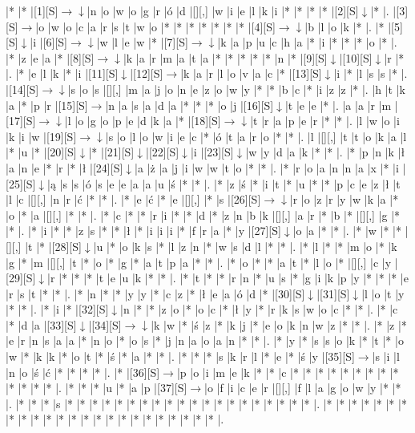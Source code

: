 \documentclass[11pt]{article}
\newcommand\drarr{$\rightarrow \!\!\!\!\! \downarrow$}
\newcommand\rarr{$\rightarrow$}
\newcommand\darr{$\downarrow$}
\begin{document}
\noindent\begin{Puzzle}{23}{29}|*	|*	|[1][S]\drarr	|n	|o	|w	|o	|g	|r	|ó	|d	|[][,]{ }	|w	|i	|e	|l	|k	|i	|*	|*	|*	|*	|[2][S]\darr	|*	|.
|[3][S]\rarr	|o	|w	|o	|c	|a	|r	|s	|t	|w	|o	|*	|*	|*	|*	|*	|*	|*	|[4][S]\drarr	|b	|l	|o	|k	|*	|.
|*	|[5][S]\darr	|i	|[6][S]\drarr	|w	|l	|e	|w	|*	|[7][S]\drarr	|k	|a	|p	|u	|c	|h	|a	|*	|i	|*	|*	|*	|o	|*	|.
|*	|z	|e	|a	|*	|[8][S]\drarr	|k	|a	|r	|m	|a	|t	|a	|*	|*	|*	|*	|*	|n	|*	|[9][S]\darr	|[10][S]\darr	|r	|*	|.
|*	|e	|l	|k	|*	|i	|[11][S]\darr	|[12][S]\rarr	|k	|a	|r	|l	|o	|v	|a	|c	|*	|[13][S]\darr	|i	|*	|l	|s	|s	|*	|.
|[14][S]\drarr	|s	|o	|s	|[][,]{ }	|m	|a	|j	|o	|n	|e	|z	|o	|w	|y	|*	|*	|b	|c	|*	|i	|z	|z	|*	|.
|h	|t	|k	|a	|*	|p	|r	|[15][S]\rarr	|n	|a	|s	|a	|d	|a	|*	|*	|*	|o	|j	|[16][S]\darr	|t	|e	|e	|*	|.
|a	|a	|r	|m	|[17][S]\drarr	|l	|o	|g	|o	|p	|e	|d	|k	|a	|*	|[18][S]\drarr	|t	|r	|a	|p	|e	|r	|*	|*	|.
|l	|w	|o	|i	|k	|i	|w	|[19][S]\drarr	|s	|o	|l	|o	|w	|i	|e	|c	|*	|ó	|t	|a	|r	|o	|*	|*	|.
|l	|[][,]{ }	|t	|t	|o	|k	|a	|l	|*	|u	|*	|[20][S]\darr	|*	|[21][S]\darr	|[22][S]\darr	|i	|[23][S]\darr	|w	|y	|d	|a	|k	|*	|*	|.
|*	|p	|n	|k	|ł	|a	|n	|e	|*	|r	|*	|ł	|[24][S]\darr	|a	|ż	|a	|j	|i	|w	|w	|t	|o	|*	|*	|.
|*	|r	|o	|a	|n	|n	|a	|x	|*	|i	|[25][S]\darr	|ą	|s	|s	|ó	|s	|e	|e	|a	|a	|u	|ś	|*	|*	|.
|*	|z	|ś	|*	|i	|t	|*	|u	|*	|*	|p	|c	|e	|z	|ł	|t	|l	|c	|[][,]{ }	|n	|r	|ć	|*	|*	|.
|*	|e	|ć	|*	|e	|[][,]{ }	|*	|s	|[26][S]\drarr	|r	|o	|z	|r	|y	|w	|k	|a	|*	|o	|*	|a	|[][,]{ }	|*	|*	|.
|*	|c	|*	|*	|r	|i	|*	|*	|d	|*	|z	|n	|b	|k	|[][,]{ }	|a	|r	|*	|b	|*	|[][,]{ }	|g	|*	|*	|.
|*	|i	|*	|*	|z	|s	|*	|*	|ł	|*	|i	|i	|i	|*	|f	|r	|a	|*	|y	|[27][S]\darr	|o	|a	|*	|*	|.
|*	|w	|*	|*	|[][,]{ }	|t	|*	|[28][S]\darr	|u	|*	|o	|k	|s	|*	|l	|z	|n	|*	|w	|s	|d	|l	|*	|*	|.
|*	|l	|*	|*	|m	|o	|*	|k	|g	|*	|m	|[][,]{ }	|t	|*	|o	|*	|g	|*	|a	|t	|p	|a	|*	|*	|.
|*	|o	|*	|*	|a	|t	|*	|l	|o	|*	|[][,]{ }	|c	|y	|[29][S]\darr	|r	|*	|*	|*	|t	|e	|u	|k	|*	|*	|.
|*	|t	|*	|*	|r	|n	|*	|u	|s	|*	|g	|i	|k	|p	|y	|*	|*	|*	|e	|r	|s	|t	|*	|*	|.
|*	|n	|*	|*	|y	|y	|*	|c	|z	|*	|ł	|e	|a	|ó	|d	|*	|[30][S]\darr	|[31][S]\darr	|l	|o	|t	|y	|*	|*	|.
|*	|i	|*	|[32][S]\darr	|n	|*	|*	|z	|o	|*	|o	|c	|*	|ł	|y	|*	|r	|k	|s	|w	|o	|c	|*	|*	|.
|*	|c	|*	|d	|a	|[33][S]\darr	|[34][S]\drarr	|k	|w	|*	|ś	|z	|*	|k	|j	|*	|e	|o	|k	|n	|w	|z	|*	|*	|.
|*	|z	|*	|e	|r	|n	|s	|a	|a	|*	|n	|o	|*	|o	|s	|*	|j	|n	|a	|o	|a	|n	|*	|*	|.
|*	|y	|*	|s	|s	|o	|k	|*	|t	|*	|o	|w	|*	|k	|k	|*	|o	|t	|*	|ś	|*	|a	|*	|*	|.
|*	|*	|*	|s	|k	|r	|l	|*	|e	|*	|ś	|y	|[35][S]\rarr	|s	|i	|l	|n	|o	|ś	|ć	|*	|*	|*	|*	|.
|*	|[36][S]\rarr	|p	|o	|i	|m	|e	|k	|*	|*	|c	|*	|*	|*	|*	|*	|*	|*	|*	|*	|*	|*	|*	|*	|.
|*	|*	|*	|u	|*	|a	|p	|[37][S]\rarr	|o	|f	|i	|c	|e	|r	|[][,]{ }	|f	|l	|a	|g	|o	|w	|y	|*	|*	|.
|*	|*	|*	|s	|*	|*	|*	|*	|*	|*	|*	|*	|*	|*	|*	|*	|*	|*	|*	|*	|*	|*	|*	|*	|.
|*	|*	|*	|*	|*	|*	|*	|*	|*	|*	|*	|*	|*	|*	|*	|*	|*	|*	|*	|*	|*	|*	|*	|*	|.\end{Puzzle}
\end{document}
